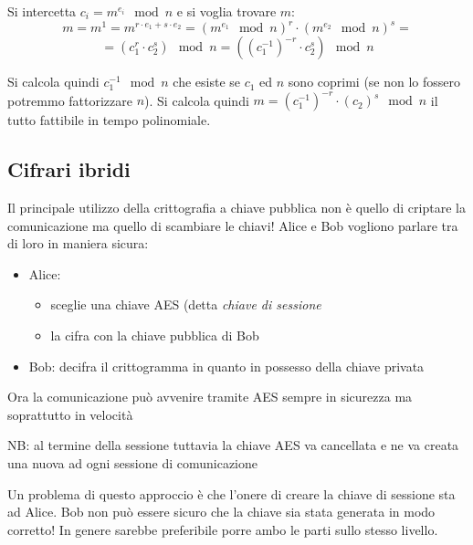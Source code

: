 Si intercetta $c_i = m^{e_i} \mod n$ e si voglia trovare $m$:
$$ m = m^1 = m^{r \cdot e_1 + s \cdot e_2 } = (m^{e_1} \mod n)^{r} \cdot (m^{e_2} \mod n)^{s} = $$
$$ = (c_1^r \cdot c_2^s) \mod n = ((c_1^{-1})^{-r} \cdot c_2^s) \mod n $$

Si calcola quindi $c_1^{-1} \mod n$ che esiste se $c_1$ ed $n$ sono coprimi (se non lo fossero potremmo fattorizzare $n$). Si calcola quindi $m = (c_1^{-1})^{-r} \cdot (c_2)^{s} \mod n$ il tutto fattibile in tempo polinomiale.

\subsection{Cifrari ibridi}
Il principale utilizzo della crittografia a chiave pubblica non è quello di criptare la comunicazione ma quello di scambiare le chiavi! Alice e Bob vogliono parlare tra di loro in maniera sicura:
\begin{itemize}
    \item Alice: 
    \begin{itemize}
        \item sceglie una chiave AES (detta \emph{chiave di sessione}
        \item la cifra con la chiave pubblica di Bob
    \end{itemize}
    \item Bob: decifra il crittogramma in quanto in possesso della chiave privata
\end{itemize}
Ora la comunicazione può avvenire tramite AES sempre in sicurezza ma soprattutto in velocità

NB: al termine della sessione tuttavia la chiave AES va cancellata e ne va creata una nuova ad ogni sessione di comunicazione

Un problema di questo approccio è che l'onere di creare la chiave di sessione sta ad Alice. Bob non può essere sicuro che la chiave sia stata generata in modo corretto!
In genere sarebbe preferibile porre ambo le parti sullo stesso livello.